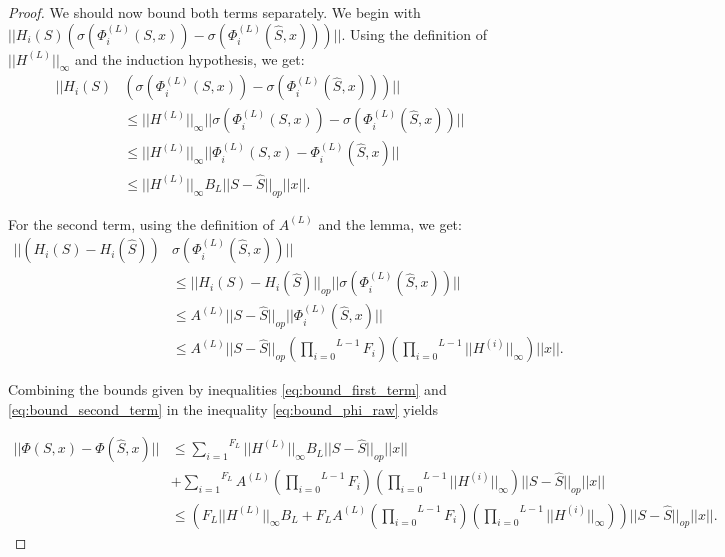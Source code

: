 \documentclass[11pt,a4paper]{article}
\newcommand{\op}[1]{|| #1 ||_{op}}
\newcommand{\ninf}[1]{|| #1 ||_\infty}
\newcommand{\Sum}[2]{\overset{#2}{\underset{#1}{\sum}}}
\newcommand{\Prod}[2]{\overset{#2}{\underset{#1}{\prod}}}
\theoremstyle{definition}
\renewcommand{\leq}{\leqslant}
\begin{document}
\begin{proof}
            We should now bound both terms separately. We begin with $|| H_i (S) \left(\sigma(\Phi^{(L)}_i (S,x)) - \sigma (\Phi^{(L)}_i (\hat{S},x)) \right) ||$. Using the definition of $\ninf{H^{(L)}}$ and the induction hypothesis, we get:
            \begin{align}
                || H_i (S) &\left(\sigma(\Phi^{(L)}_i (S,x)) - \sigma (\Phi^{(L)}_i (\hat{S},x)) \right) || \\ 
                &\leq \ninf{H^{(L)}} || \sigma(\Phi^{(L)}_i (S,x)) - \sigma (\Phi^{(L)}_i (\hat{S},x))|| \nonumber \\
                &\leq \ninf{H^{(L)}} || \Phi^{(L)}_i (S,x) - \Phi^{(L)}_i (\hat{S},x)|| \nonumber \\
                &\leq \ninf{H^{(L)}} B_L \op{S - \hat{S}} ||x||.\label{eq:bound_first_term}
            \end{align}

            For the second term, using the definition of $A^{(L)}$ and the lemma, we get:
            \begin{align}
                || (H_i(S) - H_i(\hat{S}) ) & \sigma (\Phi^{(L)}_i (\hat{S},x)) || \nonumber \\
                &\leq \op{H_i(S) - H_i(\hat{S})} ||\sigma (\Phi^{(L)}_i (\hat{S},x)) || \nonumber \\
                &\leq A^{(L)} \op{S-\hat{S}} ||\Phi^{(L)}_i (\hat{S},x)|| \nonumber \\
                &\leq A^{(L)} \op{S-\hat{S}} \left( \Prod{i=0}{L-1} F_i \right) \left( \Prod{i=0}{L-1} \ninf{H^{(i)}} \right) ||x||\label{eq:bound_second_term}.
            \end{align}


            Combining the bounds given by inequalities \ref{eq:bound_first_term} and \ref{eq:bound_second_term} in the inequality \ref{eq:bound_phi_raw} yields

            \begin{align}
                || \Phi (S,x) - \Phi (\hat{S},x) || &\leq \Sum{i=1}{F_L}  \ninf{H^{(L)}} B_L \op{S - \hat{S}} ||x|| \nonumber \\
                &+ \Sum{i=1}{F_L} A^{(L)} \left( \Prod{i=0}{L-1} F_i \right) \left( \Prod{i=0}{L-1} \ninf{H^{(i)}} \right) \op{S-\hat{S}} ||x|| \\
                & \leq \left( F_L \ninf{H^{(L)}} B_L + F_L A^{(L)} \left( \Prod{i=0}{L-1} F_i \right) \left( \Prod{i=0}{L-1} \ninf{H^{(i)}} \right) \right) \op{S-\hat{S}} ||x||.
            \end{align}


\end{proof}
\end{document}
